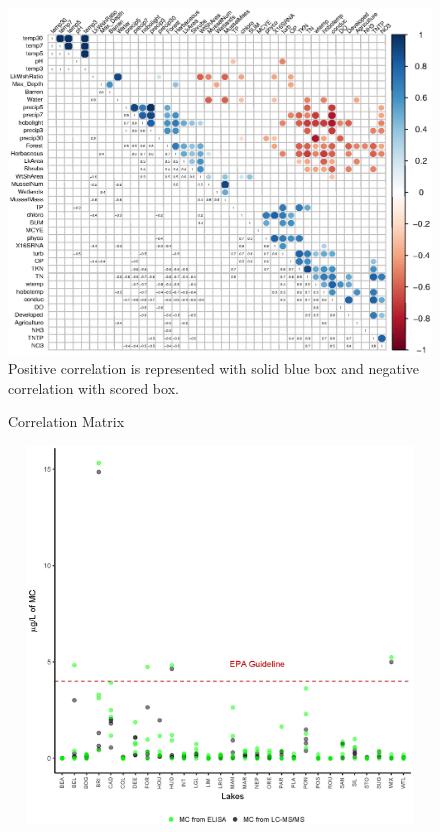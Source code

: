\documentclass{ou-thesis}
\begin{document}
\clearpage
\newpage




\begin{appendix}







\newpage


\begin{figure}[!t]
  \caption{Correlation Matrix}
  \includegraphics{matrix}
  Positive correlation is represented with solid blue box and negative correlation with scored box.
  \label{matrix}
\end{figure}

\begin{figure}[t]
  \caption{}
  \includegraphics[height=10cm, width=12cm]{Microcystin}
  \label{Yesa}
\end{figure}


\end{appendix}
\end{document}
